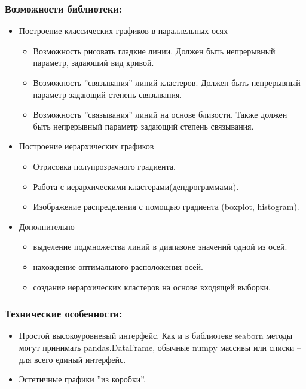 \documentclass[12pt,fleqn]{article}
\begin{document}
\subsubsection{Возможности библиотеки:}
\begin{itemize}
    \item Построение классических графиков в параллельных осях
    \begin{itemize}
        \item Возможность рисовать гладкие линии. Должен быть непрерывный параметр,
        задаюший вид кривой.
        \item Возможность ''связывания'' линий кластеров.
        Должен быть непрерывный параметр задающий степень связывания.
        \item Возможность ''связывания'' линий на основе близости. Также 
        должен быть непрерывный параметр задающий степень связывания. 
    \end{itemize}
    \item Построение иерархических графиков
    \begin{itemize}
        \item Отрисовка полупрозрачного градиента.
        \item Работа с иерархическими кластерами(дендрограммами).
        \item Изображение распределения с помощью градиента (boxplot, histogram).
    \end{itemize}
    \item Дополнительно
    \begin{itemize}
        \item выделение подмножества линий в  диапазоне значений одной из осей.
        \item нахождение оптимального расположения осей.
        \item создание иерархических кластеров на основе входящей выборки.
    \end{itemize}
\end{itemize}

\subsubsection{Технические особенности:}
\begin{itemize}
    \item Простой высокоуровневый интерфейс. Как и в библиотеке seaborn методы могут принимать pandas.DataFrame,
    обычные numpy массивы или списки -- для всего единый интерфейс.
    \item Эстетичные графики ''из коробки''.
\end{itemize}
\end{document}
